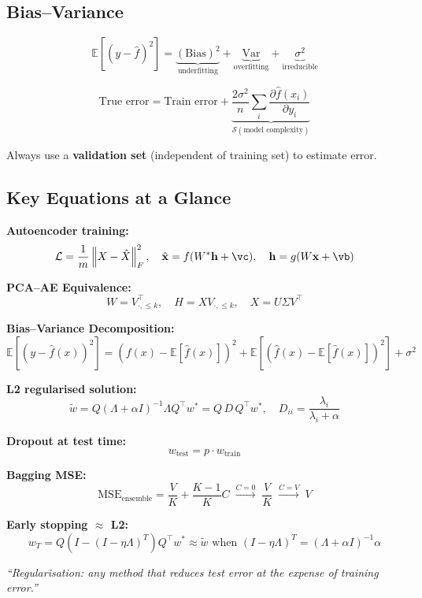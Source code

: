 \documentclass[12pt,a4paper]{article}
\newcommand{\E}{\mathbb{E}}
\newcommand{\Var}{\mathrm{Var}}
\newcommand{\Bias}{\mathrm{Bias}}
\newcommand{\norm}[1]{\left\|#1\right\|}
\newcommand{\vx}{\mathbf{x}}
\newcommand{\vh}{\mathbf{h}}
\newcommand{\hatx}{\hat{\mathbf{x}}}
\newcommand{\Loss}{\mathcal{L}}
\newcommand{\Reg}{\mathcal{S}}
\begin{document}
\subsection{Bias--Variance}

\[
\E[(y-\hat{f})^2] = \underbrace{(\Bias)^2}_{\text{underfitting}} + \underbrace{\Var}_{\text{overfitting}} + \underbrace{\sigma^2}_{\text{irreducible}}
\]

\[
\text{True error} = \text{Train error} + \underbrace{\frac{2\sigma^2}{n}\sum_i\frac{\partial\hat{f}(x_i)}{\partial y_i}}_{\Reg(\text{model complexity})}
\]

Always use a \textbf{validation set} (independent of training set) to estimate error.

\subsection{Key Equations at a Glance}

\textbf{Autoencoder training:}
\[
\Loss = \frac{1}{m}\norm{X - \hat{X}}_F^2,\quad
\hatx = f(W^*\vh + \vc),\quad
\vh = g(W\vx + \vb)
\]

\textbf{PCA--AE Equivalence:}
\[
W = V_{\cdot,\leq k}^\top,\quad
H = XV_{\cdot,\leq k},\quad
X = U\Sigma V^\top
\]

\textbf{Bias--Variance Decomposition:}
\[
\E\!\left[(y-\hat{f}(x))^2\right]
= (f(x) - \E[\hat{f}(x)])^2
+ \E[(\hat{f}(x) - \E[\hat{f}(x)])^2]
+ \sigma^2
\]

\textbf{L2 regularised solution:}
\[
\tilde{w} = Q(\Lambda + \alpha I)^{-1}\Lambda Q^\top w^*
= Q\,D\,Q^\top w^*,\quad
D_{ii} = \frac{\lambda_i}{\lambda_i + \alpha}
\]

\textbf{Dropout at test time:}
\[
w_{\text{test}} = p \cdot w_{\text{train}}
\]

\textbf{Bagging MSE:}
\[
\text{MSE}_{\text{ensemble}}
= \frac{V}{K} + \frac{K-1}{K}C
\;\xrightarrow{C=0}\;
\frac{V}{K}
\;\xrightarrow{C=V}\;
V
\]

\textbf{Early stopping $\approx$ L2:}
\[
w_T = Q(I - (I-\eta\Lambda)^T)Q^\top w^* \approx \tilde{w} \text{ when } (I-\eta\Lambda)^T = (\Lambda+\alpha I)^{-1}\alpha
\]

\begin{center}
\Large\textit{``Regularisation: any method that reduces test error at the expense of training error.''}
\end{center}

\appendix
\end{document}

